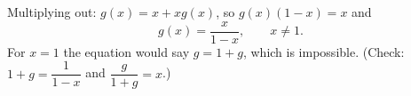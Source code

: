 Multiplying out: $g(x)=x+xg(x)$, so $g(x)(1-x)=x$ and
\[
g(x)=\boxed{\dfrac{x}{1-x}},\qquad x\ne1 .
\]
For $x=1$ the equation would say $g=1+g$, which is impossible. (Check: $1+g=\dfrac{1}{1-x}$ and $\dfrac{g}{1+g}=x$.)

